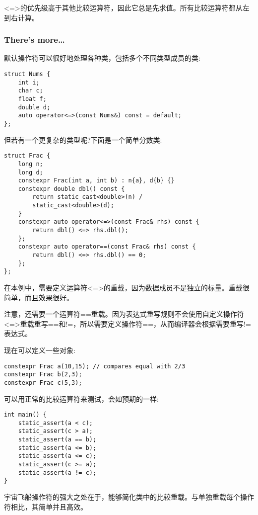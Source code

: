 \begin{tcolorbox}[colback=webgreen!5!white,colframe=webgreen!75!black,title=Note]
<=>的优先级高于其他比较运算符，因此它总是先求值。所有比较运算符都从左到右计算。
\end{tcolorbox}

\subsubsection{There's more…}

默认操作符可以很好地处理各种类，包括多个不同类型成员的类:

\begin{lstlisting}[style=styleCXX]
struct Nums {
	int i;
	char c;
	float f;
	double d;
	auto operator<=>(const Nums&) const = default;
};
\end{lstlisting}

但若有一个更复杂的类型呢?下面是一个简单分数类:

\begin{lstlisting}[style=styleCXX]
struct Frac {
	long n;
	long d;
	constexpr Frac(int a, int b) : n{a}, d{b} {}
	constexpr double dbl() const {
		return static_cast<double>(n) /
		static_cast<double>(d);
	}
	constexpr auto operator<=>(const Frac& rhs) const {
		return dbl() <=> rhs.dbl();
	};
	constexpr auto operator==(const Frac& rhs) const {
		return dbl() <=> rhs.dbl() == 0;
	};
};
\end{lstlisting}

在本例中，需要定义运算符<=>的重载，因为数据成员不是独立的标量。重载很简单，而且效果很好。

注意，还需要一个运算符==重载。因为表达式重写规则不会使用自定义操作符<=>重载重写==和!=，所以需要定义操作符==，从而编译器会根据需要重写!=表达式。

现在可以定义一些对象:

\begin{lstlisting}[style=styleCXX]
constexpr Frac a(10,15); // compares equal with 2/3
constexpr Frac b(2,3);
constexpr Frac c(5,3);
\end{lstlisting}

可以用正常的比较运算符来测试，会如预期的一样:

\begin{lstlisting}[style=styleCXX]
int main() {
	static_assert(a < c);
	static_assert(c > a);
	static_assert(a == b);
	static_assert(a <= b);
	static_assert(a <= c);
	static_assert(c >= a);
	static_assert(a != c);
}
\end{lstlisting}

宇宙飞船操作符的强大之处在于，能够简化类中的比较重载。与单独重载每个操作符相比，其简单并且高效。
















